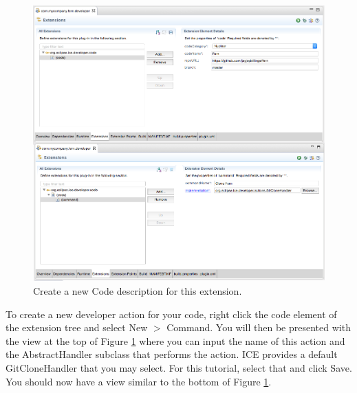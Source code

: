 \documentclass{article}
\begin{document}
\begin{figure}[h]
\includegraphics[width=\textwidth]{figures/comb.png}
\caption{Create a new Code description for this extension.}
\label{fig:config2}
\end{figure}

To create a new developer action for your code, right click the code element of
the extension tree and select New $>$ Command. You will then be presented
with the view at the top of Figure \ref{fig:config2} where you can input the
name of this action and the AbstractHandler subclass that performs the action.
ICE provides a default GitCloneHandler that you may select. For this tutorial,
select that and click Save. You should now have a view similar to the bottom of
Figure \ref{fig:config2}.

\end{document}
